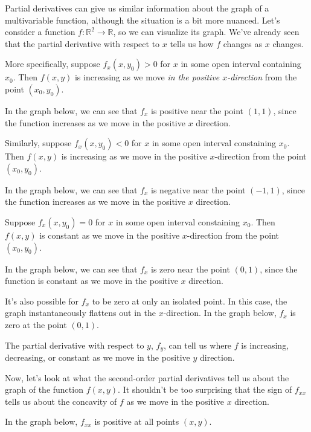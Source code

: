 \documentclass{ximera}
\begin{document}
Partial derivatives can give us similar information about the graph of a multivariable function, although the situation is a bit more nuanced. Let's consider a function $f:\mathbb{R}^2\rightarrow\mathbb{R}$, so we can visualize its graph. We've already seen that the partial derivative with respect to $x$ tells us how $f$ changes as $x$ changes.

More specifically, suppose $f_x(x,y_0)>0$ for $x$ in some open interval containing $x_0$. Then $f(x,y)$ is increasing as we move \emph{in the positive $x$-direction} from the point $(x_0,y_0)$. 

In the graph below, we can see that $f_x$ is positive near the point $(1,1)$, since the function increases as we move in the positive $x$ direction.


Similarly, suppose $f_x(x,y_0)<0$ for $x$ in some open interval constaining $x_0$. Then $f(x,y)$ is increasing as we move in the positive $x$-direction from the point $(x_0,y_0)$.

In the graph below, we can see that $f_x$ is negative near the point $(-1,1)$, since the function increases as we move in the positive $x$ direction.


Suppose $f_x(x,y_0)=0$ for $x$ in some open interval constaining $x_0$. Then $f(x,y)$ is constant as we move in the positive $x$-direction from the point $(x_0,y_0)$.

In the graph below, we can see that $f_x$ is zero near the point $(0,1)$, since the function is constant as we move in the positive $x$ direction.


It's also possible for $f_x$ to be zero at only an isolated point. In this case, the graph instantaneously flattens out in the $x$-direction. In the graph below, $f_x$ is zero at the point $(0,1)$.


The partial derivative with respect to $y$, $f_y$, can tell us where $f$ is increasing, decreasing, or constant as we move in the positive $y$ direction.

Now, let's look at what the second-order partial derivatives tell us about the graph of the function $f(x,y)$. It shouldn't be too surprising that the sign of $f_{xx}$ tells us about the concavity of $f$ as we move in the positive $x$ direction.

In the graph below, $f_{xx}$ is positive at all points $(x,y)$.
\end{document}
